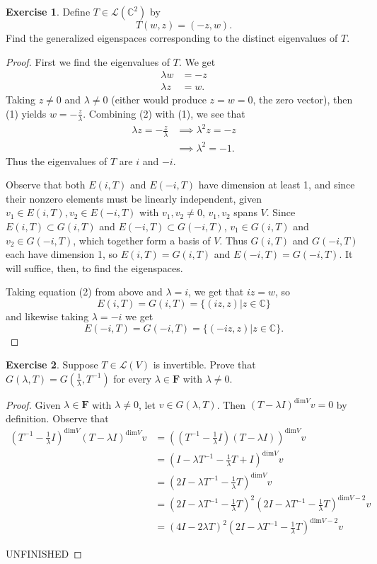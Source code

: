 \documentclass{article}
\theoremstyle{definition}
\newtheorem{ex}{Exercise}
\begin{document}
\begin{ex}
  Define $T \in \mathcal{L}(\mathbb{C}^2)$ by
  $$T(w, z) = (-z, w).$$
  Find the generalized eigenspaces corresponding to the distinct eigenvalues of $T$.
\end{ex}
\begin{proof}
  First we find the eigenvalues of $T$. We get
  \begin{align}
    \lambda w &= -z\\
    \lambda z &= w.
  \end{align}
  Taking $z \neq 0$ and $\lambda \neq 0$ (either would produce $z = w = 0$, the zero vector), then (1) yields $w = -\frac{z}{\lambda}$. Combining (2) with (1), we see that
  \begin{align*}
    \lambda z = -\frac{z}{\lambda} &\implies \lambda^2 z = -z\\
    &\implies \lambda^2 = -1.
  \end{align*}
  Thus the eigenvalues of $T$ are $i$ and $-i$.

  Observe that both $E(i, T)$ and $E(-i, T)$ have dimension at least 1, and since their nonzero elements must be linearly independent, given $v_1 \in E(i, T), v_2 \in E(-i, T)$ with $v_1, v_2 \ne 0$, $v_1, v_2$ spans $V$. Since $E(i, T) \subset G(i, T)$ and $E(-i, T) \subset G(-i, T)$, $v_1 \in G(i, T)$ and $v_2 \in G(-i, T)$, which together form a basis of $V$. Thus $G(i, T)$ and $G(-i, T)$ each have dimension 1, so $E(i, T) = G(i, T)$ and $E(-i, T) = G(-i, T)$. It will suffice, then, to find the eigenspaces.

  Taking equation (2) from above and $\lambda = i$, we get that $iz = w$, so
  $$E(i, T) = G(i, T) = \lbrace (iz, z) | z \in \mathbb{C} \rbrace$$
  and likewise taking $\lambda = -i$ we get
  $$E(-i, T) = G(-i, T) = \lbrace (-iz, z) | z \in \mathbb{C} \rbrace.$$

\end{proof}
\begin{ex}
  Suppose $T \in \mathcal{L}(V)$ is invertible. Prove that $G(\lambda, T) = G(\frac{1}{\lambda}, T^{-1})$ for every $\lambda \in \mathbf{F}$ with $\lambda \neq 0$.
\end{ex}
\begin{proof}
  Given $\lambda \in \mathbf{F}$ with $\lambda \neq 0$, let $v \in G(\lambda, T)$.
  Then $(T - \lambda I)^{\mathrm{dim}V}v = 0$ by definition.
  Observe that
  \begin{align*}
    (T^{-1} - \frac{1}{\lambda} I)^{\mathrm{dim}V}(T - \lambda I)^{\mathrm{dim} V}v &= ((T^{-1} - \frac{1}{\lambda}I)(T-\lambda I))^{\mathrm{dim}V}v\\
    &= (I - \lambda T^{-1} - \frac{1}{\lambda}T + I)^{\mathrm{dim}V}v\\
    &= (2I - \lambda T^{-1} - \frac{1}{\lambda}T)^{\mathrm{dim}V}v\\
    &= (2I - \lambda T^{-1} - \frac{1}{\lambda}T)^{2}(2I - \lambda T^{-1} - \frac{1}{\lambda}T)^{\mathrm{dim}V - 2}v\\
    &= (4I - 2 \lambda T )^{2}(2I - \lambda T^{-1} - \frac{1}{\lambda}T)^{\mathrm{dim}V - 2}v
  \end{align*}

  UNFINISHED
\end{proof}
\end{document}
